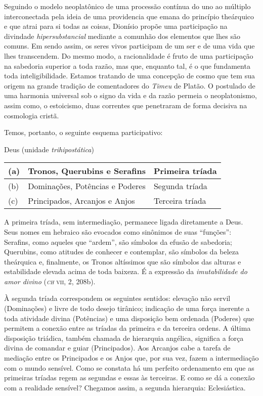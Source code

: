 {Seguindo o modelo neoplatônico de uma processão contínua do uno ao
múltiplo interconectada pela ideia de uma providencia que emana do
princípio theárquico e que atrai para si todas as coisas, Dionísio
propõe uma participação na divindade \emph{hipersubstancial} mediante
a comunhão dos elementos que lhes são comuns. Em sendo assim, os seres
vivos participam de um ser e de uma vida que lhes transcendem. Do mesmo
modo, a racionalidade é fruto de uma participação na sabedoria superior
a toda razão, mas que, enquanto tal, é o que fundamenta toda
inteligibilidade. Estamos tratando de uma concepção de cosmo que tem
sua origem na grande tradição de comentadores do \emph{Timeu} de
Platão. O postulado de uma harmonia universal sob o signo da vida e da
razão permeia o neoplatonismo, assim como, o estoicismo, duas correntes
que penetraram de forma decisiva na cosmologia cristã. 

Temos, portanto, o seguinte esquema participativo:

\renewcommand{\caption}[1]{{\centering#1}\par}

\begin{table}[h]
\caption{Deus (unidade \emph{trihipostática})}
\begin{tabular}{lll}
(a) & Tronos, Querubins e Serafins & Primeira tríada\\\hline
(b) & Dominações, Potências e Poderes & Segunda tríada\\\hline
(c) & Principados, Arcanjos e Anjos & Terceira tríada 
\end{tabular}
\end{table}



A primeira tríada, sem intermediação, permanece ligada diretamente a 
Deus. Seus nomes em hebraico são evocados como sinônimos de suas
“funções”: Serafins, como aqueles que “ardem”, são símbolos da efusão de
sabedoria; Querubins, como atitudes de conhecer e contemplar, são símbolos
da beleza theárquica e, finalmente, os Tronos altíssimos que são
símbolos das alturas e estabilidade elevada acima de toda baixeza. É a
expressão da \emph{imutabilidade do amor divino} (\textsc{\emph{ch} vii}, 2, 208b). 

À segunda tríada correspondem os seguintes sentidos: elevação não servil
(Dominações) e livre de todo desejo tirânico; indicação de uma força
inerente a toda atividade divina (Potências) e uma disposição bem
ordenada (Poderes) que permitem a conexão entre as tríadas da primeira
e da terceira ordens. A última disposição triádica, também chamada de
hierarquia angélica, significa a força divina de comandar e guiar
(Principados). Aos Arcanjos cabe a tarefa de mediação entre os
Principados e os Anjos que, por sua vez, fazem a intermediação com o
mundo sensível. Como se constata há um perfeito ordenamento em que as
primeiras tríadas regem as segundas e essas às terceiras. E como se dá
a conexão com a realidade sensível? Chegamos assim, a segunda
hierarquia: Eclesiástica.

}
